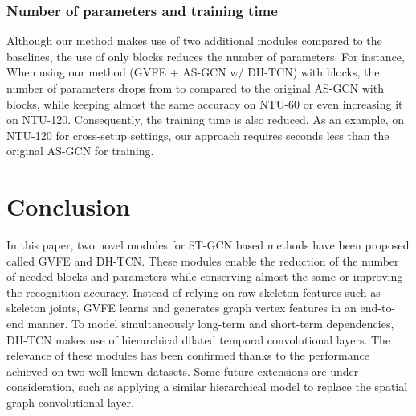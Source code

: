 \documentclass{article}
\begin{document}
\begin{table}[ht!]
        \centering
        \caption{Ablation study: accuracy of recognition (\%) on NTU-120 dataset for cross-setup settings using ST-GCN as a baseline. *These values are not reported in the state-of-the-art. Thus, the available codes have been used to obtain these results }
        \label{tab:results_ablation}
    \end{table}


\subsubsection{Number of parameters and training time}

Although our method makes use of two additional modules compared to the baselines, the use of only  blocks reduces the number of parameters. For instance, When using our method (GVFE + AS-GCN w/ DH-TCN) with  blocks, the number of parameters drops from  to  compared to the original AS-GCN with  blocks, while keeping almost the same accuracy on NTU-60 or even increasing it on NTU-120. Consequently, the training time is also reduced. As an example, on NTU-120 for cross-setup settings, our approach requires  seconds less than the original AS-GCN for training. 

\section{Conclusion}
\label{sec:conclusion}

In this paper, two novel modules for ST-GCN based methods have been proposed called GVFE and DH-TCN. These modules enable the reduction of the number of needed blocks and parameters while conserving almost the same or improving the recognition accuracy. Instead of relying on raw skeleton features such as skeleton joints, GVFE learns and generates graph vertex features in an end-to-end manner. To model simultaneously long-term and short-term dependencies, DH-TCN makes use of hierarchical dilated temporal convolutional layers. The relevance of these modules has been confirmed thanks to the performance achieved on two well-known datasets. Some future extensions are under consideration, such as applying a similar hierarchical model to replace the spatial graph convolutional layer. 
\end{document}
